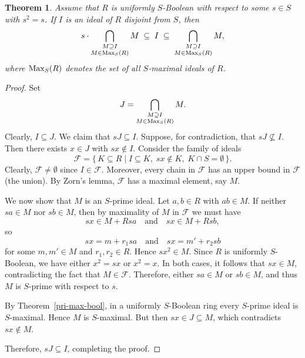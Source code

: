 \documentclass[12pt]{article}
\newtheorem{thm}{\bf Theorem}[section]
\def\Max{{\rm Max}}
\begin{document}
\begin{thm}\label{r3} Assume that $R$ is uniformly $S$-Boolean with respect to some $s \in S$ with $s^2=s$.
If $I$ is an ideal of $R$ disjoint from $S$, then 
\[
s \cdot \bigcap_{\substack{M \supseteq I \\ M \in \Max_{S}(R)}} M \;\subseteq\; I \;\subseteq\; \bigcap_{\substack{M \supseteq I \\ M \in \Max_{S}(R)}} M,
\]
where $\Max_{S}(R)$ denotes the set of all $S$-maximal ideals of $R$.
\end{thm}

\begin{proof}
 Set
\[
J = \bigcap_{\substack{M \supseteq I \\ M \in \Max_{S}(R)}} M.
\]
Clearly, $I \subseteq J$. We claim that $sJ \subseteq I$. Suppose, for contradiction, that $sJ \nsubseteq I$. Then there exists $x \in J$ with $sx \notin I$. Consider the family of ideals
\[
\mathcal{F} = \{\, K \subseteq R \mid I \subseteq K, \; sx \notin K, \; K \cap S = \emptyset \,\}.
\]
Clearly, $\mathcal{F} \neq \emptyset$ since $I \in \mathcal{F}$. Moreover, every chain in $\mathcal{F}$ has an upper bound in $\mathcal{F}$ (the union). By Zorn's lemma, $\mathcal{F}$ has a maximal element, say $M$.

We now show that $M$ is an $S$-prime ideal. Let $a, b \in R$ with $ab \in M$. If neither $sa \in M$ nor $sb \in M$, then by maximality of $M$ in $\mathcal{F}$ we must have
\[
sx \in M + Rsa \quad \text{and} \quad sx \in M + Rsb,
\]
so
\[
sx = m + r_1 sa \quad \text{and} \quad sx = m' + r_2 sb
\]
for some $m, m' \in M$ and $r_1, r_2 \in R$. Hence $sx^2 \in M$. Since \(R\) is uniformly \(S\)-Boolean, we have either \(x^2 = sx\) or \(x^2 = x\).  In both cases, it follows that \(sx \in M\), contradicting the fact that  \(M\in \mathcal{F}\). Therefore, either $sa \in M$ or $sb \in M$, and thus $M$ is $S$-prime with respect to $s$.

By Theorem~\ref{pri-max-bool}, in a uniformly $S$-Boolean ring every $S$-prime ideal is $S$-maximal. Hence $M$ is $S$-maximal. But then $sx \in J \subseteq M$, which contradicts $sx \notin M$.  

Therefore, $sJ \subseteq I$, completing the proof.
\end{proof}
 
\end{document}
